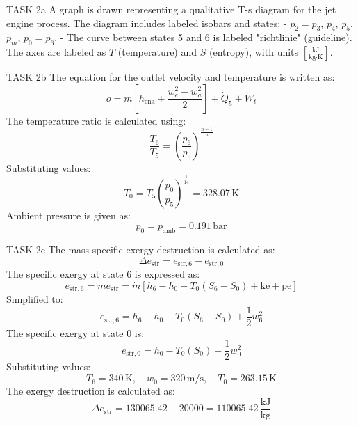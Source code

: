 TASK 2a  
A graph is drawn representing a qualitative T-s diagram for the jet engine process. The diagram includes labeled isobars and states:  
- \( p_2 = p_3 \), \( p_4 \), \( p_5 \), \( p_m \), \( p_0 = p_6 \).  
- The curve between states 5 and 6 is labeled "richtlinie" (guideline).  
The axes are labeled as \( T \) (temperature) and \( S \) (entropy), with units \( \left[\frac{\text{kJ}}{\text{kg·K}}\right] \).  

TASK 2b  
The equation for the outlet velocity and temperature is written as:  
\[
o = \dot{m} \left[ h_{\text{ena}} + \frac{w_e^2 - w_a^2}{2} \right] + \dot{Q}_5 + \dot{W}_t
\]  
The temperature ratio is calculated using:  
\[
\frac{T_6}{T_5} = \left( \frac{p_6}{p_5} \right)^{\frac{n-1}{n}}
\]  
Substituting values:  
\[
T_0 = T_5 \left( \frac{p_0}{p_5} \right)^{\frac{1}{14}} = 328.07 \, \text{K}
\]  
Ambient pressure is given as:  
\[
p_0 = p_{\text{amb}} = 0.191 \, \text{bar}
\]  

TASK 2c  
The mass-specific exergy destruction is calculated as:  
\[
\Delta e_{\text{str}} = e_{\text{str},6} - e_{\text{str},0}
\]  
The specific exergy at state 6 is expressed as:  
\[
e_{\text{str},6} = m e_{\text{str}} = \dot{m} \left[ h_6 - h_0 - T_0 (S_6 - S_0) + \text{ke} + \text{pe} \right]
\]  
Simplified to:  
\[
e_{\text{str},6} = h_6 - h_0 - T_0 (S_6 - S_0) + \frac{1}{2} w_6^2
\]  
The specific exergy at state 0 is:  
\[
e_{\text{str},0} = h_0 - T_0 (S_0) + \frac{1}{2} w_0^2
\]  
Substituting values:  
\[
T_6 = 340 \, \text{K}, \quad w_0 = 320 \, \text{m/s}, \quad T_0 = 263.15 \, \text{K}
\]  
The exergy destruction is calculated as:  
\[
\Delta e_{\text{str}} = 130065.42 - 20000 = 110065.42 \, \frac{\text{kJ}}{\text{kg}}
\]